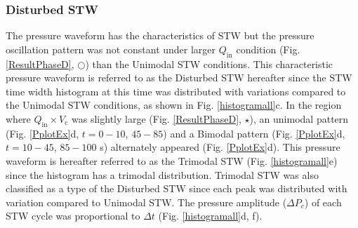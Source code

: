 \documentclass[aps,pre,preprint,groupedaddress,showkeys]{revtex4-2}
\begin{document}
\subsubsection{Disturbed STW}
The pressure waveform has the characteristics of STW but the pressure oscillation pattern was not constant under larger $Q_\mathrm{in} $ condition (Fig. \ref {ResultPhaseD}, $\bigcirc$) than the Unimodal STW conditions.
This characteristic pressure waveform is referred to as the Disturbed STW hereafter since the STW time width histogram at this time was distributed with variations compared to the Unimodal STW conditions, as shown in Fig. \ref{histogramall}c.
In the region where $ Q_ \mathrm{in} \times V_\mathrm{c} $ was slightly large (Fig. \ref{ResultPhaseD}, $\star$), an unimodal pattern (Fig. \ref{PplotEx}d, $ t = 0 - 10 $, $ 45 - 85 $) and a Bimodal pattern (Fig. \ref{PplotEx}d, $ t = 10 -  45 $, $ 85 - 100 $ s) alternately appeared (Fig. \ref{PplotEx}d).
This pressure waveform is hereafter referred to as the Trimodal STW (Fig. \ref{histogramall}e) since the histogram has a trimodal distribution.
Trimodal STW was also classified as a type of the Disturbed STW since each peak was distributed with variation compared to Unimodal STW. 
The pressure amplitude ($ \Delta P_c $) of each STW cycle was proportional to $ \Delta t $ (Fig. \ref{histogramall}d, f).
\end{document}
